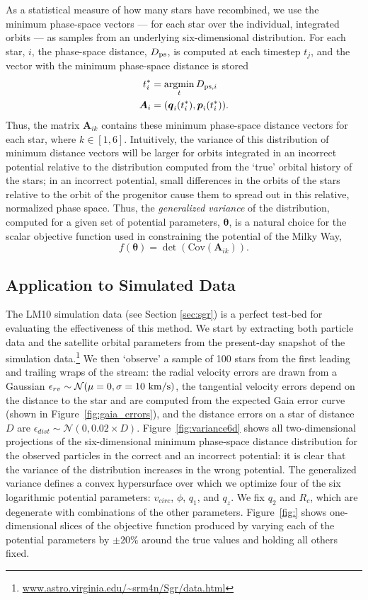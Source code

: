 \documentclass[preprint]{aastex}
\newcommand{\bs}{\boldsymbol}
\newcommand{\argmin}{\operatornamewithlimits{argmin}}
\begin{document}
As a statistical measure of how many stars have recombined, we
use the minimum phase-space vectors --- for
each star over the individual, integrated orbits --- as samples from an underlying six-dimensional distribution. For each star, $i$,
the phase-space distance, $D_{\rm ps}$, is computed at each timestep
$t_{j}$, and the vector with the minimum phase-space distance is stored
\begin{align}
  t^*_{i} &= \argmin_{t} D_{{\rm ps},i}\\
  \bs{A}_{i} &= (\bs{q}_{i}(t^*_{i}),\bs{p}_{i}(t^*_{i})).
\end{align}
Thus, the matrix $\bs{A}_{ik}$ contains these minimum phase-space distance vectors for each star,
where $k\in[1,6]$. Intuitively, the variance of this distribution of minimum distance vectors
will be larger for orbits integrated in an incorrect potential
relative to the distribution computed from the `true' orbital history
of the stars; in an incorrect potential, small differences in the
orbits of the stars relative to the orbit of the progenitor cause them
to spread out in this relative, normalized phase space. Thus, the
\emph{generalized variance} of the distribution, computed for a given
set of potential parameters, $\bs{\theta}$, is a natural choice for
the scalar objective function used in constraining the potential of
the Milky Way,
\begin{equation}
  f(\bs{\theta})=\det(\mathrm{Cov}( \bs{A}_{ik})).
\end{equation}

\subsection{Application to Simulated Data}
The LM10 simulation data (see Section \ref{sec:sgr}) is a perfect
test-bed for evaluating the effectiveness of this method. We start by
extracting both particle data and the satellite orbital parameters
from the present-day snapshot of the simulation
data.\footnote{\url{www.astro.virginia.edu/~srm4n/Sgr/data.html}} We then
`observe' a sample of 100 stars from the first leading and trailing
wraps of the stream: the radial velocity errors are drawn from a
Gaussian $\epsilon_{rv} \sim \mathcal{N}(\mu=0,\sigma=10~{\rm km/s})$,
the tangential velocity errors depend on the distance to the star and
are computed from the expected Gaia error curve (shown in
Figure~\ref{fig:gaia_errors}), and the distance errors on a star of distance
$D$ are $\epsilon_{dist} \sim \mathcal{N}(0,0.02\times
D)$. Figure~\ref{fig:variance6d} shows all two-dimensional projections of the six-dimensional minimum
phase-space distance distribution for the observed particles in the
correct and an incorrect potential: it is clear that the
variance of the distribution increases in the wrong potential. The 
generalized variance defines a convex hypersurface over which we
optimize four of the six logarithmic potential parameters:
$v_{circ}$, $\phi$, $q_1$, and $q_z$. We fix $q_2$ and $R_c$, which are degenerate with combinations of the other parameters. Figure~\ref{fig:} shows one-dimensional slices of the objective function
produced by varying each of the potential parameters by
$\pm20\%$ around the true values and holding all others fixed.
\end{document}

